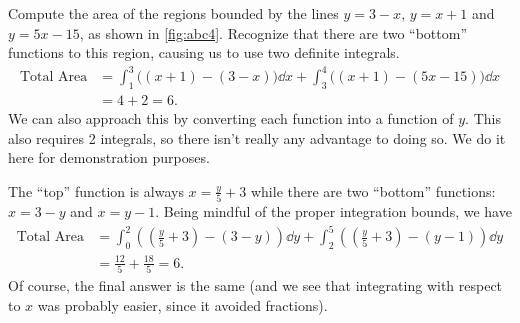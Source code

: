 \begin{example}\label{ex_abc4}%
Compute the area of the regions bounded by the lines
$y=3-x$, $y=x+1$ and $y=5x-15$, as shown in \autoref{fig:abc4}.
\solution
Recognize that there are two ``bottom'' functions to this region, causing us to use two definite integrals.
\begin{align*}
	\text{Total Area}
	&= \int_1^3\bigl((x+1)-(3-x)\bigr)\dd x + \int_3^4\bigl((x+1)-(5x-15)\bigr)\dd x \\
	&= 4+2
	= 6.
\end{align*}
We can also approach this by converting each function into a function of $y$. This also requires 2 integrals, so there isn't really any advantage to doing so. We do it here for demonstration purposes.

The ``top'' function is always $x=\frac y5+3$ while there are two ``bottom'' functions: $x=3-y$ and $x=y-1$. Being mindful of the proper integration bounds, we have
\begin{align*}
	\text{Total Area}
	&= \int_0^2\left(\left(\frac y5+3\right) - (3-y)\right)\dd y
	+ \int_2^5\left(\left(\frac y5+3\right) - (y-1)\right)\dd y \\
	&= \frac{12}5 + \frac{18}5
	= 6.
\end{align*}
Of course, the final answer is the same (and we see that integrating with respect to $x$ was probably easier, since it avoided fractions).
\end{example}

